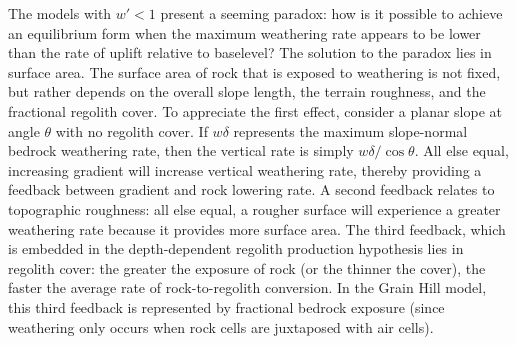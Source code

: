 \documentclass[esurf, manuscript]{copernicus}
\begin{document}
The models with $w' < 1$ present a seeming paradox: how is it possible to achieve an equilibrium form when the maximum weathering rate appears to be lower than the rate of uplift relative to baselevel? The solution to the paradox lies in surface area. The surface area of rock that is exposed to weathering is not fixed, but rather depends on the overall slope length, the terrain roughness, and the fractional regolith cover. To appreciate the first effect, consider a planar slope at angle $\theta$ with no regolith cover. If $w\delta$ represents the maximum slope-normal bedrock weathering rate, then the vertical rate is simply $w\delta / \cos \theta$. All else equal, increasing gradient will increase vertical weathering rate, thereby providing a feedback between gradient and rock lowering rate. A second feedback relates to topographic roughness: all else equal, a rougher surface will experience a greater weathering rate because it provides more surface area. The third feedback, which is embedded in the depth-dependent regolith production hypothesis \citep{ahnert1967role} lies in regolith cover: the greater the exposure of rock (or the thinner the cover), the faster the average rate of rock-to-regolith conversion. In the Grain Hill model, this third feedback is represented by fractional bedrock exposure (since weathering only occurs when rock cells are juxtaposed with air cells).

\end{document}
